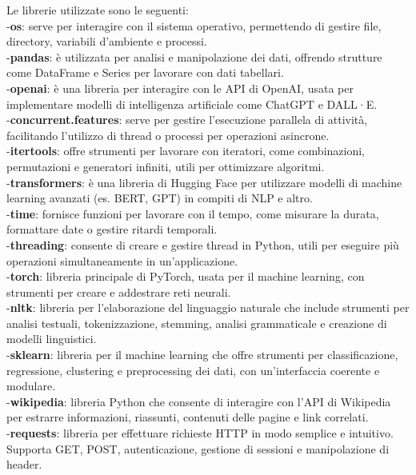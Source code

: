 \documentclass[12pt]{article}
\begin{document}
\newpage
Le librerie utilizzate sono le seguenti:\\
-\textbf{os}: serve per interagire con il sistema operativo, permettendo di gestire file, directory, variabili d'ambiente e processi.\\  
-\textbf{pandas}: è utilizzata per analisi e manipolazione dei dati, offrendo strutture come DataFrame e Series per lavorare con dati tabellari.\\  
-\textbf{openai}: è una libreria per interagire con le API di OpenAI, usata per implementare modelli di intelligenza artificiale come ChatGPT e DALL·E.\\  
-\textbf{concurrent.features}: serve per gestire l’esecuzione parallela di attività, facilitando l’utilizzo di thread o processi per operazioni asincrone.\\  
-\textbf{itertools}: offre strumenti per lavorare con iteratori, come combinazioni, permutazioni e generatori infiniti, utili per ottimizzare algoritmi.\\
-\textbf{transformers}: è una libreria di Hugging Face per utilizzare modelli di machine learning avanzati (es. BERT, GPT) in compiti di NLP e altro.  \\
-\textbf{time}: fornisce funzioni per lavorare con il tempo, come misurare la durata, formattare date o gestire ritardi temporali.\\  
-\textbf{threading}: consente di creare e gestire thread in Python, utili per eseguire più operazioni simultaneamente in un'applicazione.\\  
-\textbf{torch}: libreria principale di PyTorch, usata per il machine learning, con strumenti per creare e addestrare reti neurali. \\ 
-\textbf{nltk}: libreria per l'elaborazione del linguaggio naturale che include strumenti per analisi testuali, tokenizzazione, stemming, analisi grammaticale e creazione di modelli linguistici. \\
-\textbf{sklearn}: libreria per il machine learning che offre strumenti per classificazione, regressione, clustering e preprocessing dei dati, con un'interfaccia coerente e modulare. \\
-\textbf{wikipedia}: libreria Python che consente di interagire con l'API di Wikipedia per estrarre informazioni, riassunti, contenuti delle pagine e link correlati. \\
-\textbf{requests}: libreria per effettuare richieste HTTP in modo semplice e intuitivo. Supporta GET, POST, autenticazione, gestione di sessioni e manipolazione di header. \\
\end{document}
